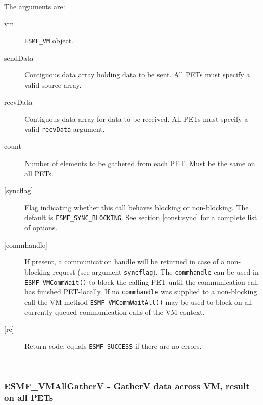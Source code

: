      The arguments are:
     \begin{description}
     \item[vm] 
          {\tt ESMF\_VM} object.
     \item[sendData]
          Contiguous data array holding data to be sent. All PETs must specify a
          valid source array.
     \item[recvData] 
          Contiguous data array for data to be received. All PETs must specify a
          valid {\tt recvData} argument.
     \item[count] 
          Number of elements to be gathered from each PET. Must be the
          same on all PETs.
     \item[{[syncflag]}]
          Flag indicating whether this call behaves blocking or non-blocking.
          The default is {\tt ESMF\_SYNC\_BLOCKING}. See section
          \ref{const:sync} for a complete list of options.
     \item[{[commhandle]}]
          If present, a communication handle will be returned in case of a 
          non-blocking request (see argument {\tt syncflag}). The
          {\tt commhandle} can be used in {\tt ESMF\_VMCommWait()} to block the
          calling PET until the communication call has finished PET-locally. If
          no {\tt commhandle} was supplied to a non-blocking call the VM method
          {\tt ESMF\_VMCommWaitAll()} may be used to block on all currently queued
          communication calls of the VM context.
     \item[{[rc]}] 
          Return code; equals {\tt ESMF\_SUCCESS} if there are no errors.
     \end{description}
   
 
\mbox{}\hrulefill\ 
 
\subsubsection [ESMF\_VMAllGatherV] {ESMF\_VMAllGatherV - GatherV data across VM, result on all PETs}


